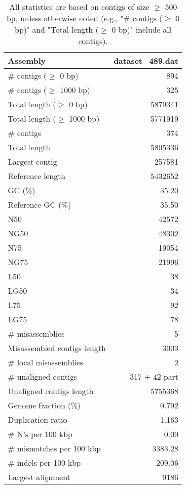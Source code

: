 \documentclass[12pt,a4paper]{article}
\begin{document}
\begin{table}[ht]
\begin{center}
\caption{All statistics are based on contigs of size $\geq$ 500 bp, unless otherwise noted (e.g., "\# contigs ($\geq$ 0 bp)" and "Total length ($\geq$ 0 bp)" include all contigs).}
\begin{tabular}{|l*{1}{|r}|}
\hline
Assembly & dataset\_489.dat \\ \hline
\# contigs ($\geq$ 0 bp) & 894 \\ \hline
\# contigs ($\geq$ 1000 bp) & 325 \\ \hline
Total length ($\geq$ 0 bp) & 5879341 \\ \hline
Total length ($\geq$ 1000 bp) & 5771919 \\ \hline
\# contigs & 374 \\ \hline
Total length & 5805336 \\ \hline
Largest contig & 257581 \\ \hline
Reference length & 5432652 \\ \hline
GC (\%) & 35.20 \\ \hline
Reference GC (\%) & 35.50 \\ \hline
N50 & 42572 \\ \hline
NG50 & 48302 \\ \hline
N75 & 19054 \\ \hline
NG75 & 21996 \\ \hline
L50 & 38 \\ \hline
LG50 & 34 \\ \hline
L75 & 92 \\ \hline
LG75 & 78 \\ \hline
\# misassemblies & 5 \\ \hline
Misassembled contigs length & 3003 \\ \hline
\# local misassemblies & 2 \\ \hline
\# unaligned contigs & 317 + 42 part \\ \hline
Unaligned contigs length & 5755368 \\ \hline
Genome fraction (\%) & 0.792 \\ \hline
Duplication ratio & 1.163 \\ \hline
\# N's per 100 kbp & 0.00 \\ \hline
\# mismatches per 100 kbp & 3383.28 \\ \hline
\# indels per 100 kbp & 209.06 \\ \hline
Largest alignment & 9186 \\ \hline
\end{tabular}
\end{center}
\end{table}
\end{document}
